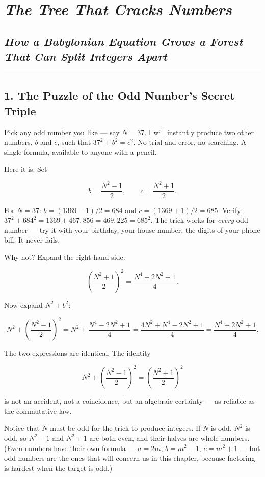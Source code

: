 \chapter{\texorpdfstring{\emph{The Tree That Cracks Numbers}}{The Tree That Cracks Numbers}}
\section{\texorpdfstring{\emph{How a Babylonian Equation Grows a Forest That Can Split Integers Apart}}{How a Babylonian Equation Grows a Forest That Can Split Integers Apart}}
\bigskip\noindent\rule{\linewidth}{0.4pt}\bigskip

\section{1. The Puzzle of the Odd Number's Secret Triple}
Pick any odd number you like --- say \(N = 37\). I will instantly produce two other numbers, \(b\) and \(c\), such that \(37^2 + b^2 = c^2\). No trial and error, no searching. A single formula, available to anyone with a pencil.

Here it is. Set

\[b = \frac{N^2 - 1}{2}, \qquad c = \frac{N^2 + 1}{2}.\]

For \(N = 37\): \(b = (1369 - 1)/2 = 684\) and \(c = (1369 + 1)/2 = 685\). Verify: \(37^2 + 684^2 = 1369 + 467{,}856 = 469{,}225 = 685^2\). The trick works for \emph{every} odd number --- try it with your birthday, your house number, the digits of your phone bill. It never fails.

Why not? Expand the right-hand side:

\[\left(\frac{N^2 + 1}{2}\right)^{\!2} = \frac{N^4 + 2N^2 + 1}{4}.\]

Now expand \(N^2 + b^2\):

\[N^2 + \left(\frac{N^2 - 1}{2}\right)^{\!2} = N^2 + \frac{N^4 - 2N^2 + 1}{4} = \frac{4N^2 + N^4 - 2N^2 + 1}{4} = \frac{N^4 + 2N^2 + 1}{4}.\]

The two expressions are identical. The identity

\[N^2 + \left(\frac{N^2 - 1}{2}\right)^{\!2} = \left(\frac{N^2 + 1}{2}\right)^{\!2}\]

is not an accident, not a coincidence, but an algebraic certainty --- as reliable as the commutative law.

Notice that \(N\) must be odd for the trick to produce integers. If \(N\) is odd, \(N^2\) is odd, so \(N^2 - 1\) and \(N^2 + 1\) are both even, and their halves are whole numbers. (Even numbers have their own formula --- \(a = 2m\), \(b = m^2 - 1\), \(c = m^2 + 1\) --- but odd numbers are the ones that will concern us in this chapter, because factoring is hardest when the target is odd.)

